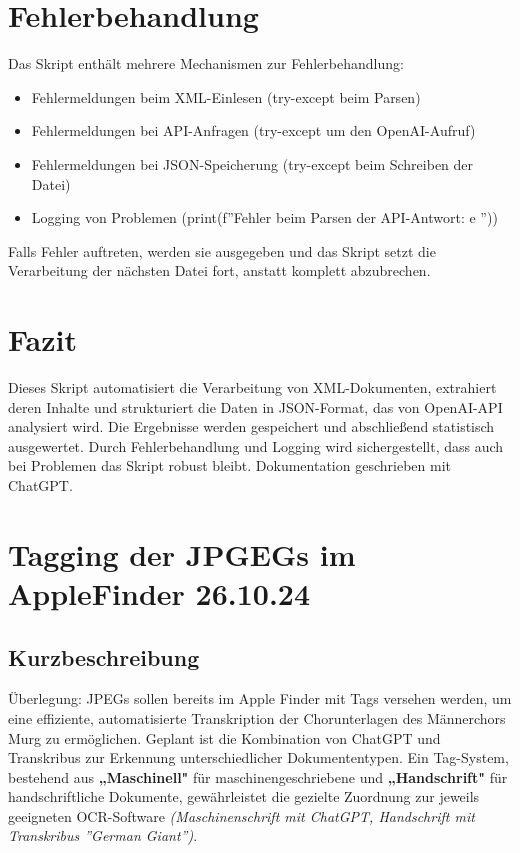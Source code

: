 \documentclass{article}
\begin{document}
\section{Fehlerbehandlung}
Das Skript enthält mehrere Mechanismen zur Fehlerbehandlung:
\begin{itemize}
\item Fehlermeldungen beim XML-Einlesen (try-except beim Parsen)
\item Fehlermeldungen bei API-Anfragen (try-except um den OpenAI-Aufruf)
\item Fehlermeldungen bei JSON-Speicherung (try-except beim Schreiben der Datei)
\item Logging von Problemen (print(f''Fehler beim Parsen der API-Antwort: {e} ''))
\end{itemize}

Falls Fehler auftreten, werden sie ausgegeben und das Skript setzt die Verarbeitung der nächsten Datei fort, anstatt komplett abzubrechen.

\section{Fazit}
Dieses Skript automatisiert die Verarbeitung von XML-Dokumenten, extrahiert deren Inhalte und strukturiert die Daten in JSON-Format, das von OpenAI-API analysiert wird. Die Ergebnisse werden gespeichert und abschließend statistisch ausgewertet. Durch Fehlerbehandlung und Logging wird sichergestellt, dass auch bei Problemen das Skript robust bleibt. Dokumentation geschrieben mit ChatGPT.

\noindent\hrulefill
\section{Tagging der JPGEGs im AppleFinder \small 26.10.24 } %

\subsection*{Kurzbeschreibung}

Überlegung:
JPEGs sollen bereits im Apple Finder mit Tags versehen werden, um eine effiziente, automatisierte Transkription der Chorunterlagen des Männerchors Murg zu ermöglichen. Geplant ist die Kombination von ChatGPT und Transkribus zur Erkennung unterschiedlicher Dokumententypen. Ein Tag-System, bestehend aus \textbf{„Maschinell"} für maschinengeschriebene und \textbf{„Handschrift"} für handschriftliche Dokumente, gewährleistet die gezielte Zuordnung zur jeweils geeigneten OCR-Software \textit{(Maschinenschrift mit ChatGPT, Handschrift mit Transkribus ''German Giant'')}.
\end{document}
